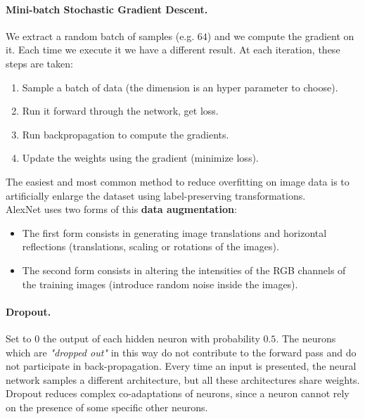 \paragraph*{Mini-batch Stochastic Gradient Descent.} We extract a random batch of samples (e.g. $64$) and we compute the gradient on it. Each time we execute it we have a different result. At each iteration, these steps are taken:
\begin{enumerate}
	\item Sample a batch of data (the dimension is an hyper parameter to choose).
	\item Run it forward through the network, get loss.
	\item Run backpropagation to compute the gradients.
	\item Update the weights using the gradient (minimize loss).
\end{enumerate} 

The easiest and most common method to reduce overfitting on image data is to artificially enlarge the dataset using label-preserving transformations.\\
AlexNet uses two forms of this \textbf{data augmentation}:
\begin{itemize}
	\item The first form consists in generating image translations and horizontal reflections (translations, scaling or rotations of the images).
	\item The second form consists in altering the intensities of the RGB channels of the training images (introduce random noise inside the images). 
\end{itemize}


\paragraph*{Dropout.} Set to 0 the output of each hidden neuron with probability $0.5$. The neurons which are \textit{"dropped out"} in this way do not contribute to the forward pass and do not participate in back-propagation. Every time an input is presented, the neural network samples a different architecture, but all these architectures share weights.\\
Dropout reduces complex co-adaptations of neurons, since a neuron cannot rely on the presence of some specific other neurons.
